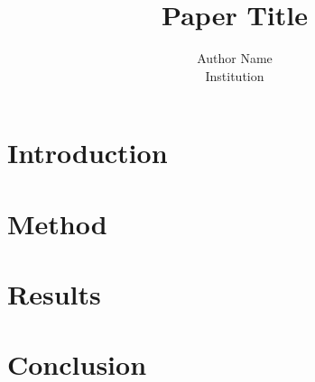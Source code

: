 \documentclass[10pt,conference]{IEEEtran}
\begin{document}
\title{Paper Title}
\author{Author Name\\Institution}
\maketitle

\begin{abstract}
\end{abstract}

\section{Introduction}

\section{Method}

\section{Results}

\section{Conclusion}



\end{document}
